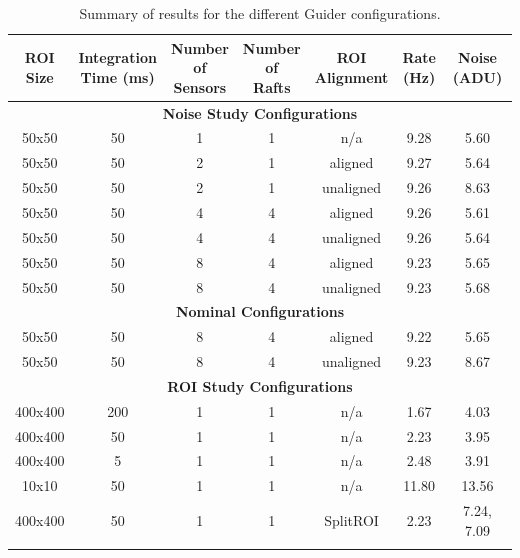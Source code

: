 \begin{longtable}[ht]{|c|c|c|c|c|c|c|}
\caption{Summary of results for the different Guider configurations.}\\
\hline
\makecell{\textbf{ROI} \\ \textbf{Size}} & 
\makecell{\textbf{Integration} \\ \textbf{Time (ms)}} & 
\makecell{\textbf{Number} \\ \textbf{of} \\ \textbf{Sensors}} &
\makecell{\textbf{Number} \\ \textbf{of} \\ \textbf{Rafts}} &
\makecell{\textbf{ROI} \\ \textbf{Alignment}} &
\makecell{\textbf{Rate} \\ \textbf{(Hz)}} &
\makecell{\textbf{Noise} \\ \textbf{(ADU)}} \\
\hline
\hline
\endhead
\multicolumn{7}{|c|}{\textbf{Noise Study Configurations}} \\
\hline
50x50   & 50  & 1 & 1 & n/a       &  9.28 & 5.60 \\ %
50x50   & 50  & 2 & 1 & aligned   &  9.27 & 5.64 \\ %
50x50   & 50  & 2 & 1 & unaligned &  9.26 & 8.63 \\ %
50x50   & 50  & 4 & 4 & aligned   &  9.26 & 5.61 \\ %
50x50   & 50  & 4 & 4 & unaligned &  9.26 & 5.64 \\ %
50x50   & 50  & 8 & 4 & aligned   &  9.23 & 5.65 \\ %
50x50   & 50  & 8 & 4 & unaligned &  9.23 & 5.68 \\ %
\hline
\multicolumn{7}{|c|}{\textbf{Nominal Configurations}} \\
\hline
50x50   & 50  & 8 & 4 & aligned   &  9.22 & 5.65 \\ %
50x50   & 50  & 8 & 4 & unaligned &  9.23 & 8.67 \\ %
\hline
\multicolumn{7}{|c|}{\textbf{ROI Study Configurations}} \\
\hline
400x400 & 200 & 1 & 1 & n/a       &  1.67 & 4.03 \\ %
400x400 &  50 & 1 & 1 & n/a       &  2.23 & 3.95 \\ %
400x400 &   5 & 1 & 1 & n/a       &  2.48 & 3.91 \\ %
10x10   &  50 & 1 & 1 & n/a       & 11.80 & 13.56 \\ %
400x400 &  50 & 1 & 1 & SplitROI  &  2.23 & 7.24, 7.09 \\ %
\hline
\label{tab:gds_configs}
\end{longtable}

